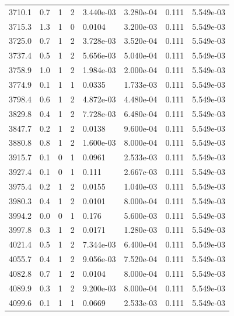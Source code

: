 \documentclass[preview]{standalone}
\begin{document}
{{{{{{{\begin{tabular}{L{1.2cm}C{1.2cm} C{0.3cm}C{0.5cm} C{1.4cm}C{1.4cm} C{1.4cm}C{1.4cm}}
  3710.1  &   0.7  & 1     &  2 &  3.440e-03  & 3.280e-04  & 0.111 &  5.549e-03   \\ 
  3715.3  &   1.3  & 1     &  0 &  0.0104  & 3.200e-03  & 0.111 &  5.549e-03   \\ 
  3725.0  &   0.7  & 1     &  2 &  3.728e-03  & 3.520e-04  & 0.111 &  5.549e-03   \\ 
  3737.4  &   0.5  & 1     &  2 &  5.656e-03  & 5.040e-04  & 0.111 &  5.549e-03   \\ 
  3758.9  &   1.0  & 1     &  2 &  1.984e-03  & 2.000e-04  & 0.111 &  5.549e-03   \\ 
  3774.9  &   0.1  & 1     &  1 &  0.0335  & 1.733e-03  & 0.111 &  5.549e-03   \\ 
  3798.4  &   0.6  & 1     &  2 &  4.872e-03  & 4.480e-04  & 0.111 &  5.549e-03   \\ 
  3829.8  &   0.4  & 1     &  2 &  7.728e-03  & 6.480e-04  & 0.111 &  5.549e-03   \\ 
  3847.7  &   0.2  & 1     &  2 &  0.0138  & 9.600e-04  & 0.111 &  5.549e-03   \\ 
  3880.8  &   0.8  & 1     &  2 &  1.600e-03  & 8.000e-04  & 0.111 &  5.549e-03   \\ 
  3915.7  &   0.1  & 0     &  1 &  0.0961  & 2.533e-03  & 0.111 &  5.549e-03   \\ 
  3927.4  &   0.1  & 0     &  1 &  0.111  & 2.667e-03  & 0.111 &  5.549e-03   \\ 
  3975.4  &   0.2  & 1     &  2 &  0.0155  & 1.040e-03  & 0.111 &  5.549e-03   \\ 
  3980.3  &   0.4  & 1     &  2 &  0.0101  & 8.000e-04  & 0.111 &  5.549e-03   \\ 
  3994.2  &   0.0  & 0     &  1 &  0.176  & 5.600e-03  & 0.111 &  5.549e-03   \\ 
  3997.8  &   0.3  & 1     &  2 &  0.0171  & 1.280e-03  & 0.111 &  5.549e-03   \\ 
  4021.4  &   0.5  & 1     &  2 &  7.344e-03  & 6.400e-04  & 0.111 &  5.549e-03   \\ 
  4055.7  &   0.4  & 1     &  2 &  9.056e-03  & 7.520e-04  & 0.111 &  5.549e-03   \\ 
  4082.8  &   0.7  & 1     &  2 &  0.0104  & 8.000e-04  & 0.111 &  5.549e-03   \\ 
  4089.9  &   0.3  & 1     &  2 &  9.200e-03  & 8.000e-04  & 0.111 &  5.549e-03   \\ 
  4099.6  &   0.1  & 1     &  1 &  0.0669  & 2.533e-03  & 0.111 &  5.549e-03   \\ 

\end{tabular}}}}}}}}
\end{document}
